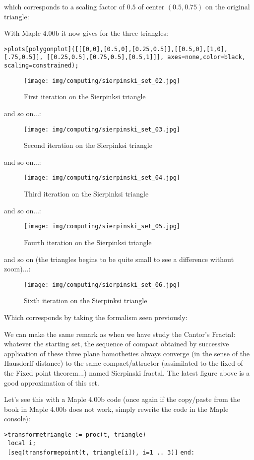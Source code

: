 	which corresponds to a scaling factor of $0.5$ of center $(0.5,0.75)$ on the original triangle:
	
	With Maple 4.00b it now gives for the three triangles:
	
	\texttt{>plots[polygonplot]([[[0,0],[0.5,0],[0.25,0.5]],[[0.5,0],[1,0],[.75,0.5]], [[0.25,0.5],[0.75,0.5],[0.5,1]]], axes=none,color=black, scaling=constrained);}
	\begin{figure}[H]
		\centering
		\texttt{[image: img/computing/sierpinski\_set\_02.jpg]}
		\caption[]{First iteration on the Sierpinksi triangle}
	\end{figure}
	and so on...:
	\begin{figure}[H]
		\centering
		\texttt{[image: img/computing/sierpinski\_set\_03.jpg]}
		\caption[]{Second iteration on the Sierpinksi triangle}
	\end{figure}
	and so on...:
	\begin{figure}[H]
		\centering
		\texttt{[image: img/computing/sierpinski\_set\_04.jpg]}
		\caption[]{Third iteration on the Sierpinksi triangle}
	\end{figure}
	and so on...:
	\begin{figure}[H]
		\centering
		\texttt{[image: img/computing/sierpinski\_set\_05.jpg]}
		\caption[]{Fourth iteration on the Sierpinksi triangle}
	\end{figure}
	and so on (the triangles begins to be quite small to see a difference without zoom)...:
	\begin{figure}[H]
		\centering
		\texttt{[image: img/computing/sierpinski\_set\_06.jpg]}
		\caption[]{Sixth iteration on the Sierpinksi triangle}
	\end{figure}
	Which corresponds by taking the formalism seen previously:
	
	We can make the same remark as when we have study the Cantor's Fractal: whatever the starting set, the sequence of compact obtained by successive application of these three plane homotheties always converge (in the sense of the Hausdorff distance) to the same compact/attractor (assimilated to the fixed of the Fixed point theorem...) named Sierpinski fractal. The latest figure above is a good approximation of this set.
	
	Let's see this with a Maple 4.00b code (once again if the copy/paste from the book in Maple 4.00b does not work, simply rewrite the code in the Maple console):
	
	\texttt{>transforme\textunderscore triangle := proc(t, triangle)}\\	
    \texttt{   local i;}\\
    \texttt{   [seq(transforme\textunderscore point(t, triangle[i]), i=1 .. 3)]}    
	\texttt{end:}\\

